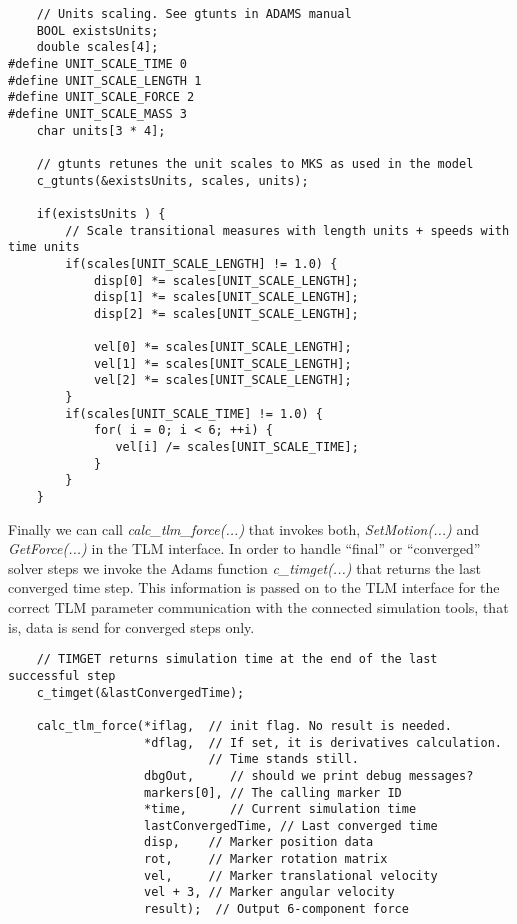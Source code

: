 {
\scriptsize
\begin{verbatim}
    // Units scaling. See gtunts in ADAMS manual
    BOOL existsUnits;
    double scales[4];
#define UNIT_SCALE_TIME 0
#define UNIT_SCALE_LENGTH 1
#define UNIT_SCALE_FORCE 2
#define UNIT_SCALE_MASS 3
    char units[3 * 4];

    // gtunts retunes the unit scales to MKS as used in the model
    c_gtunts(&existsUnits, scales, units);

    if(existsUnits ) {	
        // Scale transitional measures with length units + speeds with time units
        if(scales[UNIT_SCALE_LENGTH] != 1.0) {
            disp[0] *= scales[UNIT_SCALE_LENGTH];
            disp[1] *= scales[UNIT_SCALE_LENGTH];
            disp[2] *= scales[UNIT_SCALE_LENGTH];

            vel[0] *= scales[UNIT_SCALE_LENGTH];
            vel[1] *= scales[UNIT_SCALE_LENGTH];
            vel[2] *= scales[UNIT_SCALE_LENGTH];	
        }
        if(scales[UNIT_SCALE_TIME] != 1.0) {
            for( i = 0; i < 6; ++i) {
               vel[i] /= scales[UNIT_SCALE_TIME];
            }
        }
    }
\end{verbatim}
}

Finally we can call {\em calc\_tlm\_force(...)} that invokes both, {\em
  SetMotion(...)} and {\em GetForce(...)} in the TLM interface. In
order to handle ``final'' or ``converged'' solver steps we invoke the
Adams function {\em c\_timget(...)} that returns the last converged
time step. This information is passed on to the TLM interface for the
correct TLM parameter communication with the connected simulation
tools, that is, data is send for converged steps only.

{
\scriptsize
\begin{verbatim}
    // TIMGET returns simulation time at the end of the last successful step
    c_timget(&lastConvergedTime);

    calc_tlm_force(*iflag,  // init flag. No result is needed.
                   *dflag,  // If set, it is derivatives calculation.
                            // Time stands still.
                   dbgOut,     // should we print debug messages?
                   markers[0], // The calling marker ID
                   *time,      // Current simulation time
                   lastConvergedTime, // Last converged time
                   disp,    // Marker position data
                   rot,     // Marker rotation matrix
                   vel,     // Marker translational velocity
                   vel + 3, // Marker angular velocity
                   result);  // Output 6-component force
\end{verbatim}
}

